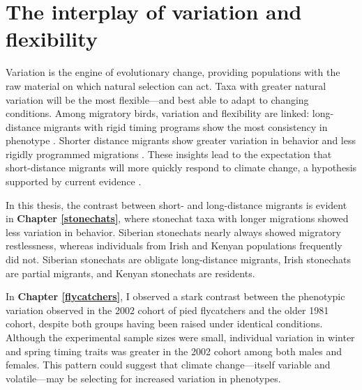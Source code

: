 \documentclass[a4paper, nobind]{templates/ociamthesis}
\begin{document}
\hypertarget{the-interplay-of-variation-and-flexibility}{%
\section*{The interplay of variation and flexibility}\label{the-interplay-of-variation-and-flexibility}}

Variation is the engine of evolutionary change, providing populations with the raw material on which natural selection can act. Taxa with greater natural variation will be the most flexible---and best able to adapt to changing conditions.
Among migratory birds, variation and flexibility are linked: long-distance migrants with rigid timing programs show the most consistency in phenotype \autocite{gwinnerCircadianCircannualProgrammes1996,gwinnerCircadianCircannualProgrammes1996}. Shorter distance migrants show greater variation in behavior and less rigidly programmed migrations \autocite{bertholdCircannualePeriodikBei1972a,gwinnerCircannualRhythmsTropical1991}. These insights lead to the expectation that short-distance migrants will more quickly respond to climate change, a hypothesis supported by current evidence \autocite{butlerDisproportionateEffectGlobal2003,usuiTemporalShiftsTemperature2017}.

In this thesis, the contrast between short- and long-distance migrants is evident in \textbf{Chapter \ref{stonechats}}, where stonechat taxa with longer migrations showed less variation in behavior. Siberian stonechats nearly always showed migratory restlessness, whereas individuals from Irish and Kenyan populations frequently did not. Siberian stonechats are obligate long-distance migrants, Irish stonechats are partial migrants, and Kenyan stonechats are residents.

In \textbf{Chapter \ref{flycatchers}}, I observed a stark contrast between the phenotypic variation observed in the 2002 cohort of pied flycatchers and the older 1981 cohort, despite both groups having been raised under identical conditions. Although the experimental sample sizes were small, individual variation in winter and spring timing traits was greater in the 2002 cohort among both males and females. This pattern could suggest that climate change---itself variable and volatile---may be selecting for increased variation in phenotypes.
\end{document}
